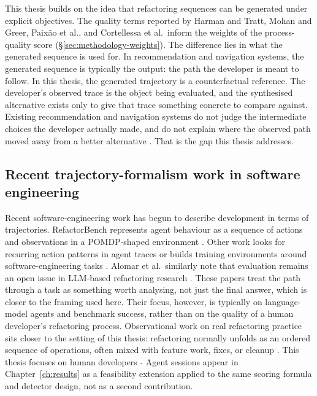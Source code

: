 This thesis builds on the idea that refactoring sequences can be generated under explicit objectives. The quality terms reported by Harman and Tratt, Mohan and Greer, Paix\~ao et al., and Cortellessa et al.\ inform the weights of the process-quality score (\S\ref{sec:methodology-weights}). The difference lies in what the generated sequence is used for. In recommendation and navigation systems, the generated sequence is typically the output: the path the developer is meant to follow. In this thesis, the generated trajectory is a counterfactual reference. The developer's observed trace is the object being evaluated, and the synthesised alternative exists only to give that trace something concrete to compare against. Existing recommendation and navigation systems do not judge the intermediate choices the developer actually made, and do not explain where the observed path moved away from a better alternative \cite{raychev2013resynth,lin2016navigator}. That is the gap this thesis addresses.

\subsection{Recent trajectory-formalism work in software engineering}
\label{sec:trajectory-formalism}

Recent software-engineering work has begun to describe development in terms of trajectories. RefactorBench represents agent behaviour as a sequence of actions and observations in a POMDP-shaped environment \cite{gautam2025refactorbench}. Other work looks for recurring action patterns in agent traces \cite{bouzenia2025trajectories} or builds training environments around software-engineering tasks \cite{pan2025swegym}. Alomar et al.\ similarly note that evaluation remains an open issue in LLM-based refactoring research \cite{alomar2025slr}. These papers treat the path through a task as something worth analysing, not just the final answer, which is closer to the framing used here. Their focus, however, is typically on language-model agents and benchmark success, rather than on the quality of a human developer's refactoring process. Observational work on real refactoring practice sits closer to the setting of this thesis: refactoring normally unfolds as an ordered sequence of operations, often mixed with feature work, fixes, or cleanup \cite{eilertsen2024refactorings}. This thesis focuses on human developers - Agent sessions appear in Chapter~\ref{ch:results} as a feasibility extension applied to the same scoring formula and detector design, not as a second contribution.

